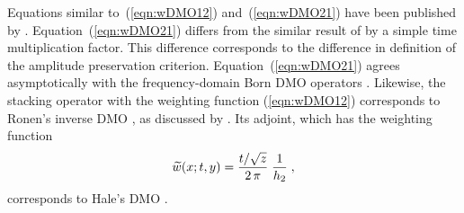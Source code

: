 Equations similar to~(\ref{eqn:wDMO12}) and~(\ref{eqn:wDMO21}) have
been published by \cite{stovas}. Equation~(\ref{eqn:wDMO21}) differs
from the similar result of \cite{black} by a simple time
multiplication factor. This difference corresponds to the difference
in definition of the amplitude preservation criterion.
Equation~(\ref{eqn:wDMO21}) agrees asymptotically with the
frequency-domain Born DMO operators
\cite[]{Born,GEO56-02-01820189,cwp}. Likewise, the stacking operator
with the weighting function (\ref{eqn:wDMO12}) corresponds to Ronen's
inverse DMO \cite[]{GEO52-07-09730984}, as discussed by
\cite{Fomel.sepphd.107}.  Its adjoint, which has the weighting
function
\begin{equation}
\widetilde{w}(x;t,y)  =  {{t/\sqrt{z}} \over {2\,\pi}}\;{1 \over h_2}\;,
\label{eqn:hDMO21}
\end{equation}
corresponds to Hale's DMO \cite[]{GEO49-06-07410757}.

